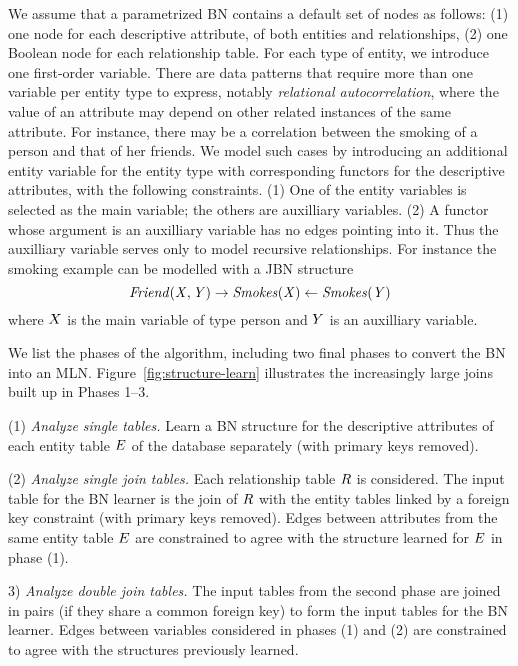 \documentclass[letterpaper]{article}
\begin{document}
We assume that a parametrized BN contains a default set of nodes as follows: (1) one node for each descriptive attribute, of both entities and relationships, (2) one Boolean node for each relationship table. For each type of entity, we introduce one first-order variable. 
There are data patterns that require  more  than one variable per entity type to express, notably {\em relational autocorrelation}, where the value of an attribute may depend on other related instances of the same attribute. For instance, there may be a  correlation between the smoking of a person and that of her friends. We model such cases by introducing an additional entity variable for the entity type with corresponding functors for the descriptive attributes, with the following constraints. (1) One of the entity variables is selected as the main variable; the others are auxilliary variables. (2) A functor whose argument is an auxilliary variable has no edges pointing into it. Thus the auxilliary variable serves only to model recursive relationships. For instance the smoking example can be modelled with a JBN structure 
\[
\it{Friend}(X,Y) \rightarrow \it{Smokes}(X) \leftarrow \it{Smokes}(Y)\] where $X$ is the main variable of type person and $Y$ is an auxilliary variable.

We list the phases of the algorithm, including two final phases to convert the BN into an MLN. Figure~\ref{fig:structure-learn} illustrates the increasingly large joins built up in Phases 1--3. 

(1) {\em Analyze single tables.} Learn a BN structure for the descriptive attributes of each entity table $E$ of the database separately (with primary keys removed).

(2) {\em Analyze single join tables.} Each relationship table $R$ is considered. The input table for the BN learner is the join of $R$ with the entity tables linked by a foreign key constraint (with primary keys removed). Edges between attributes from the same entity table $E$ are constrained to agree with the structure learned for $E$ in phase (1).

3) {\em Analyze double join tables.} The input tables from the second phase are  joined in pairs (if they share a common foreign key)
to form the input tables for the BN learner. Edges between variables considered in phases (1) and (2) are constrained to agree with the structures previously learned. 
\end{document}
